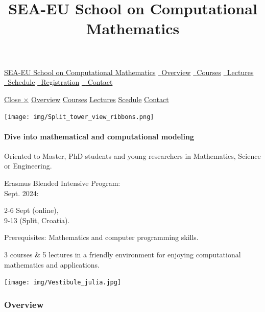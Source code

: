 \documentclass[
]{article}
\title{SEA-EU School on Computational Mathematics}
\author{}
\date{}
\begin{document}
\maketitle

\hypertarget{myNavbar}{}
\protect\hyperlink{home}{SEA-EU School on Computational Mathematics} {
\protect\hyperlink{overview}{{\emph{~}Overview}}
\protect\hyperlink{courses}{{\emph{~}Courses}}
\protect\hyperlink{lectures}{{\emph{~}Lectures}}
\protect\hyperlink{schedule}{{\emph{~}Schedule}}
\protect\hyperlink{registration}{{\emph{~}Registration}}
\protect\hyperlink{contact}{{\emph{~} Contact}} }
\href{javascript:void(0)}{\emph{}}

\href{javascript:void(0)}{Close ×}
\protect\hyperlink{overview}{Overview} \protect\hyperlink{work}{Courses}
\protect\hyperlink{team}{Lectures} \protect\hyperlink{pricing}{Scedule}
\protect\hyperlink{contact}{Contact}

\texttt{[image: img/Split\_tower\_view\_ribbons.png]}

\hypertarget{dive-into-mathematical-and-computational-modeling}{%
\paragraph{Dive into mathematical and computational
modeling}\label{dive-into-mathematical-and-computational-modeling}}

\emph{}

Oriented to Master, PhD students and young researchers in Mathematics,
Science or Engineering.

\emph{}

Erasmus Blended Intensive Program:\\

Sept. 2024:

2-6 Sept (online),\\
9-13 (Split, Croatia).

\emph{}

Prerequisites: Mathematics and computer programming skills.

\emph{}

3 courses \& 5 lectures in a friendly environment for enjoying
computational mathematics and applications.

\hypertarget{overview}{}
\texttt{[image: img/Vestibule\_julia.jpg]}

\hypertarget{overview}{%
\subsubsection{Overview}\label{overview}}
\end{document}
